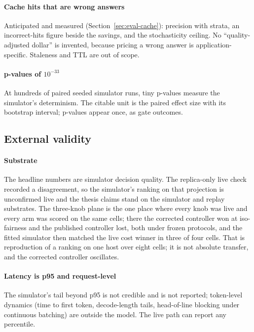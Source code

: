 \paragraph{Cache hits that are wrong answers} Anticipated and measured
(Section~\ref{sec:eval-cache}): precision with strata, an incorrect-hits
figure beside the savings, and the stochasticity ceiling. No
``quality-adjusted dollar'' is invented, because pricing a wrong answer is
application-specific. Staleness and TTL are out of scope.

\paragraph{p-values of $10^{-33}$} At hundreds of paired seeded simulator
runs, tiny p-values measure the simulator's determinism. The citable unit
is the paired effect size with its bootstrap interval; p-values appear
once, as gate outcomes.

\subsection{External validity}

\paragraph{Substrate} The headline numbers are simulator decision
quality. The replica-only live check recorded a disagreement, so the
simulator's ranking on that projection is unconfirmed live and the thesis
claims stand on the simulator and replay substrates. The three-knob plane
is the one place where every knob was live and every arm was scored on the
same cells; there the corrected controller won at iso-fairness and the
published controller lost, both under frozen protocols, and the fitted
simulator then matched the live cost winner in three of four cells. That
is reproduction of a ranking on one host over eight cells; it is not
absolute transfer, and the corrected controller oscillates.

\paragraph{Latency is p95 and request-level} The simulator's tail beyond
p95 is not credible and is not reported; token-level dynamics (time to
first token, decode-length tails, head-of-line blocking under continuous
batching) are outside the model. The live path can report any percentile.

